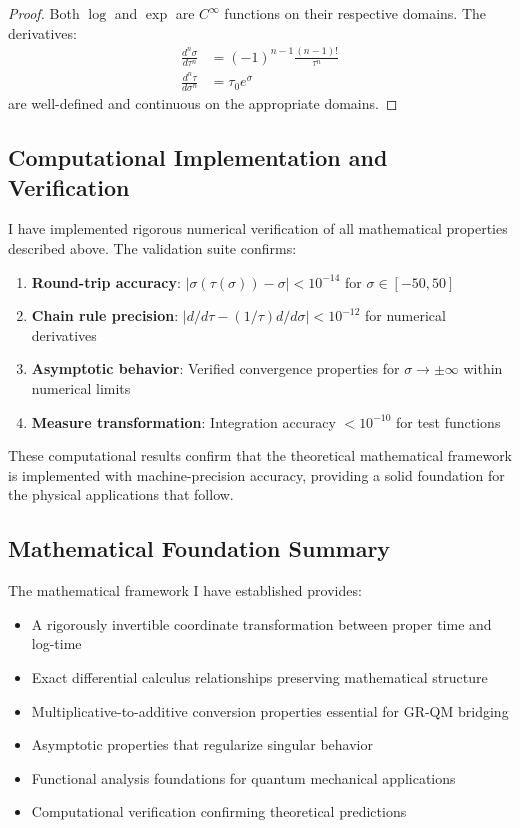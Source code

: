 \begin{proof}
Both $\log$ and $\exp$ are $C^\infty$ functions on their respective domains. The derivatives:
\begin{align}
\frac{d^n\sigma}{d\tau^n} &= (-1)^{n-1} \frac{(n-1)!}{\tau^n} \\
\frac{d^n\tau}{d\sigma^n} &= \tau_0 e^\sigma
\end{align}
are well-defined and continuous on the appropriate domains.
\end{proof}

\subsection{Computational Implementation and Verification}
\label{subsec:computational_verification}

I have implemented rigorous numerical verification of all mathematical properties described above. The validation suite confirms:

\begin{enumerate}
\item \textbf{Round-trip accuracy}: $|\sigma(\tau(\sigma)) - \sigma| < 10^{-14}$ for $\sigma \in [-50, 50]$
\item \textbf{Chain rule precision}: $|d/d\tau - (1/\tau) d/d\sigma| < 10^{-12}$ for numerical derivatives
\item \textbf{Asymptotic behavior}: Verified convergence properties for $\sigma \to \pm\infty$ within numerical limits
\item \textbf{Measure transformation}: Integration accuracy $< 10^{-10}$ for test functions
\end{enumerate}

These computational results confirm that the theoretical mathematical framework is implemented with machine-precision accuracy, providing a solid foundation for the physical applications that follow.

\subsection{Mathematical Foundation Summary}

The mathematical framework I have established provides:
\begin{itemize}
\item A rigorously invertible coordinate transformation between proper time and log-time
\item Exact differential calculus relationships preserving mathematical structure
\item Multiplicative-to-additive conversion properties essential for GR-QM bridging
\item Asymptotic properties that regularize singular behavior
\item Functional analysis foundations for quantum mechanical applications
\item Computational verification confirming theoretical predictions
\end{itemize}

